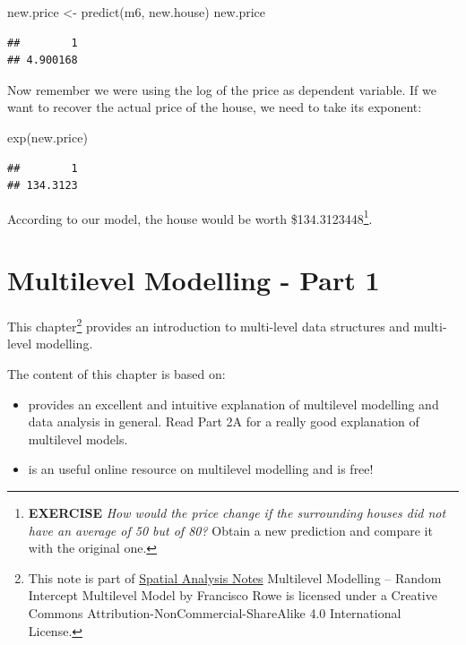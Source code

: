 \documentclass[
]{book}
\newenvironment{Shaded}{\begin{snugshade}}{\end{snugshade}}
\newcommand{\FunctionTok}[1]{\textcolor[rgb]{0.00,0.00,0.00}{#1}}
\newcommand{\NormalTok}[1]{#1}
\newcommand{\OtherTok}[1]{\textcolor[rgb]{0.56,0.35,0.01}{#1}}
\begin{document}
\begin{Shaded}
\begin{Highlighting}[]
\NormalTok{new.price }\OtherTok{\textless{}{-}} \FunctionTok{predict}\NormalTok{(m6, new.house)}
\NormalTok{new.price}
\end{Highlighting}
\end{Shaded}

\begin{verbatim}
##        1 
## 4.900168
\end{verbatim}

Now remember we were using the log of the price as dependent variable. If we want to recover the actual price of the house, we need to take its exponent:

\begin{Shaded}
\begin{Highlighting}[]
\FunctionTok{exp}\NormalTok{(new.price)}
\end{Highlighting}
\end{Shaded}

\begin{verbatim}
##        1 
## 134.3123
\end{verbatim}

According to our model, the house would be worth \$134.3123448\footnote{\textbf{EXERCISE} \emph{How would the price change if the surrounding houses did not have an average of 50 but of 80?} Obtain a new prediction and compare it with the original one.}.

\hypertarget{mlm1}{%
\chapter{Multilevel Modelling - Part 1}\label{mlm1}}

This chapter\footnote{This note is part of \href{index.html}{Spatial Analysis Notes} {Multilevel Modelling -- Random Intercept Multilevel Model} by Francisco Rowe is licensed under a Creative Commons Attribution-NonCommercial-ShareAlike 4.0 International License.} provides an introduction to multi-level data structures and multi-level modelling.

The content of this chapter is based on:

\begin{itemize}
\item
  \citet{Gelman_Hill_2006_book} provides an excellent and intuitive explanation of multilevel modelling and data analysis in general. Read Part 2A for a really good explanation of multilevel models.
\item
  \citet{bristol2020} is an useful online resource on multilevel modelling and is free!
\end{itemize}
\end{document}
